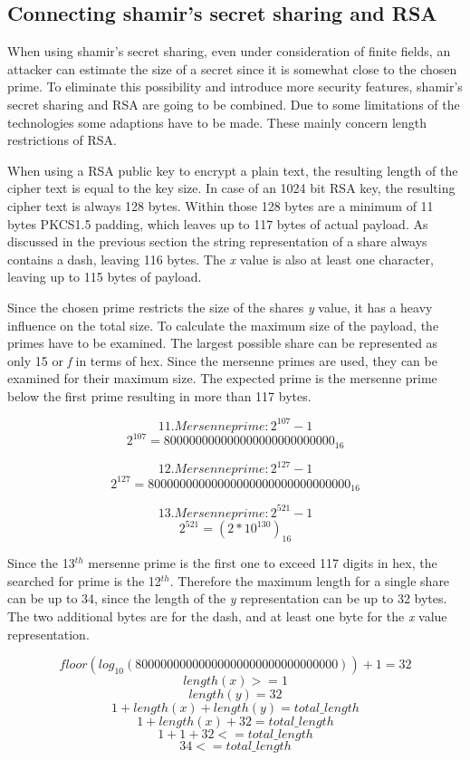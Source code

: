 \subsection{Connecting shamir's secret sharing and RSA}

When using shamir's secret sharing, even under consideration of finite fields,
an attacker can estimate the size of a secret since it is somewhat close to the
chosen prime. To eliminate this possibility and introduce more security
features, shamir's secret sharing and RSA are going to be combined. Due to some
limitations of the technologies some adaptions have to be made. These mainly
concern length restrictions of RSA.

When using a RSA public key to encrypt a plain text, the resulting length of
the cipher text is equal to the key size. In case of an 1024 bit RSA key, the
resulting cipher text is always 128 bytes. Within those 128 bytes are a minimum
of 11 bytes PKCS1.5 padding, which leaves up to 117 bytes of actual payload. As
discussed in the previous section the string representation of a share always
contains a dash, leaving 116 bytes. The \textit{x} value is also at least one
character, leaving up to 115 bytes of payload.

Since the chosen prime restricts the size of the shares \textit{y} value, it
has a heavy influence on the total size. To calculate the maximum size of the
payload, the primes have to be examined. The largest possible share can be
represented as only 15 or \textit{f} in terms of hex. Since the mersenne primes
are used, they can be examined for their maximum size. The expected prime is
the mersenne prime below the first prime resulting in more than 117 bytes.

$$11. Mersenne prime: 2^{107}-1$$
$$2^{107} = 800000000000000000000000000_{16}$$

$$12. Mersenne prime: 2^{127}-1$$
$$2^{127} = 80000000000000000000000000000000_{16}$$

$$13. Mersenne prime: 2^{521}-1$$
$$2^{521} = (2*10^{130})_{16}$$

Since the 13$^{th}$ mersenne prime is the first one to exceed 117 digits in
hex, the searched for prime is the 12$^{th}$. Therefore the maximum length for
a single share can be up to 34, since the length of the \textit{y}
representation can be up to 32 bytes. The two additional bytes are for the
dash, and at least one byte for the \textit{x} value representation.

$$floor(log_{10}(80000000000000000000000000000000)) + 1 = 32$$
$$length(x) >= 1$$
$$length(y) = 32$$
$$1 + length(x) + length(y) = total\_length$$
$$1 + length(x) + 32 = total\_length$$
$$1 + 1 + 32 <= total\_length$$
$$34 <= total\_length$$

